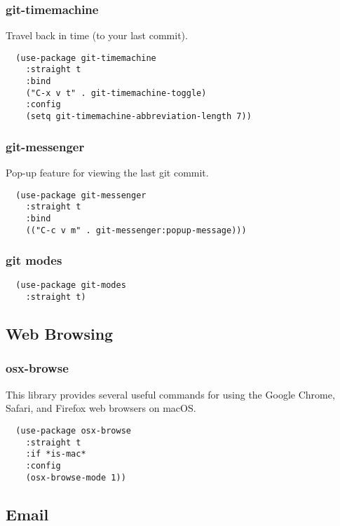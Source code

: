 \documentclass[11pt]{article}
\begin{document}
\subsubsection*{git-timemachine}
\label{sec:org35e2850}

Travel back in time (to your last commit).

\begin{verbatim}
  (use-package git-timemachine
    :straight t
    :bind
    ("C-x v t" . git-timemachine-toggle)
    :config
    (setq git-timemachine-abbreviation-length 7))
\end{verbatim}

\subsubsection*{git-messenger}
\label{sec:org3aa3257}

Pop-up feature for viewing the last git commit.

\begin{verbatim}
  (use-package git-messenger
    :straight t
    :bind
    (("C-c v m" . git-messenger:popup-message)))
\end{verbatim}

\subsubsection*{git modes}
\label{sec:orga4290ca}

\begin{verbatim}
  (use-package git-modes
    :straight t)
\end{verbatim}
\subsection*{Web Browsing}
\label{sec:org8ac190d}
\subsubsection*{osx-browse}
\label{sec:org511524a}

This library provides several useful commands for using the
Google Chrome, Safari, and Firefox web browsers on macOS.

\begin{verbatim}
  (use-package osx-browse
    :straight t
    :if *is-mac*
    :config
    (osx-browse-mode 1))
\end{verbatim}

\subsection*{Email}
\label{sec:orgeb3abb8}
\end{document}
